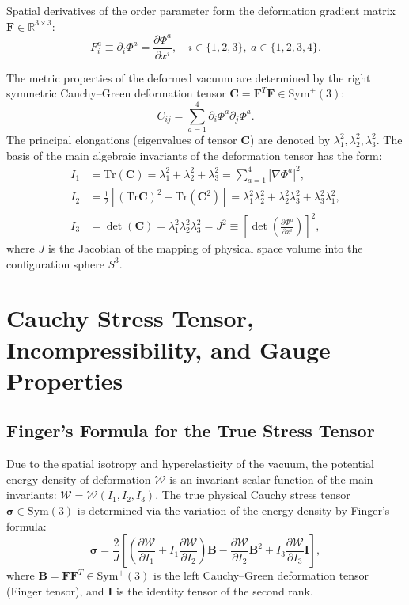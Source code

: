 \documentclass[12pt,a4paper]{article}
\begin{document}
	Spatial derivatives of the order parameter form the deformation gradient matrix $\mathbf{F} \in \mathbb{R}^{3 \times 3}$:
	\begin{equation}
		F_i^a \equiv \partial_i \Phi^a = \frac{\partial \Phi^a}{\partial x^i}, \quad i \in \{1,2,3\}, \ a \in \{1,2,3,4\}.
	\end{equation}
	
	The metric properties of the deformed vacuum are determined by the right symmetric Cauchy--Green deformation tensor $\mathbf{C} = \mathbf{F}^T \mathbf{F} \in \mathrm{Sym}^+(3)$:
	\begin{equation}
		C_{ij} = \sum_{a=1}^4 \partial_i \Phi^a \partial_j \Phi^a.
	\end{equation}
	The principal elongations (eigenvalues of tensor $\mathbf{C}$) are denoted by $\lambda_1^2, \lambda_2^2, \lambda_3^2$. The basis of the main algebraic invariants of the deformation tensor has the form:
	\begin{align}
		I_1 &= \mathrm{Tr}(\mathbf{C}) = \lambda_1^2 + \lambda_2^2 + \lambda_3^2 = \sum_{a=1}^4 |\nabla \Phi^a|^2, \\
		I_2 &= \frac{1}{2} \left[ (\mathrm{Tr}\mathbf{C})^2 - \mathrm{Tr}(\mathbf{C}^2) \right] = \lambda_1^2 \lambda_2^2 + \lambda_2^2 \lambda_3^2 + \lambda_3^2 \lambda_1^2, \\
		I_3 &= \det(\mathbf{C}) = \lambda_1^2 \lambda_2^2 \lambda_3^2 = J^2 \equiv \left[ \det\left(\frac{\partial \Phi^a}{\partial x^i}\right) \right]^2,
	\end{align}
	where $J$ is the Jacobian of the mapping of physical space volume into the configuration sphere $S^3$.
	
	\section{Cauchy Stress Tensor, Incompressibility, and Gauge Properties}
	
	\subsection{Finger's Formula for the True Stress Tensor}
	Due to the spatial isotropy and hyperelasticity of the vacuum, the potential energy density of deformation $\mathcal{W}$ is an invariant scalar function of the main invariants: $\mathcal{W} = \mathcal{W}(I_1, I_2, I_3)$. The true physical Cauchy stress tensor $\boldsymbol{\sigma} \in \mathrm{Sym}(3)$ is determined via the variation of the energy density by Finger's formula:
	\begin{equation}
		\boldsymbol{\sigma} = \frac{2}{J} \left[ \left( \frac{\partial \mathcal{W}}{\partial I_1} + I_1 \frac{\partial \mathcal{W}}{\partial I_2} \right) \mathbf{B} - \frac{\partial \mathcal{W}}{\partial I_2} \mathbf{B}^2 + I_3 \frac{\partial \mathcal{W}}{\partial I_3} \mathbf{I} \right],
	\end{equation}
	where $\mathbf{B} = \mathbf{F} \mathbf{F}^T \in \mathrm{Sym}^+(3)$ is the left Cauchy--Green deformation tensor (Finger tensor), and $\mathbf{I}$ is the identity tensor of the second rank.
	
\end{document}

